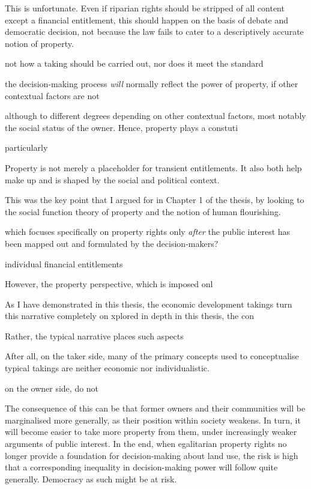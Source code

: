 This is unfortunate. Even if riparian rights should be stripped of all content except a financial entitlement, this should happen on the basis of debate and democratic decision, not because the law fails to cater to a descriptively accurate notion of property.


not how a taking should be carried out, nor does it meet the standard 




 the decision-making process {\it will} normally reflect the power of property, if other contextual factors are not 

although to different degrees depending on other contextual factors, most notably the social status of the owner. Hence, property plays a constuti


particularly 


Property is not merely a placeholder for transient entitlements. It also both help make up and is shaped by the social and political context. 


 This was the key point that I argued for in Chapter 1 of the thesis, by looking to the social function theory of property and the notion of human flourishing. 


which focuses specifically on property rights only {\it after} the public interest has been mapped out and formulated by the decision-makers? 



 individual financial entitlements 

However, the property perspective, which is imposed onl

As I have demonstrated in this thesis, the economic development takings turn this narrative completely on  xplored in depth in this thesis, the con

Rather, the typical narrative places such aspects

After all, on the taker side, many of the primary concepts used to conceptualise typical takings are neither economic nor individualistic.

 on the owner side, do not 

The consequence of this can be that former owners and their communities will be marginalised more generally, as their position within society weakens. In turn, it will become easier to take more property from them, under increasingly weaker arguments of public interest. In the end, when egalitarian property rights no longer provide a foundation for decision-making about land use, the risk is high that a corresponding inequality in decision-making power will follow quite generally. Democracy as such might be at risk.

